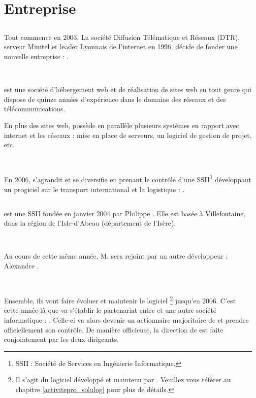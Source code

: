 \chapter{Entreprise}
\section{\fidit}
Tout commence en 2003. La société Diffusion Télématique et Réseaux (DTR), serveur Minitel et leader Lyonnais de l'internet en 1996, décide de fonder une nouvelle entreprise : \fidit{}.

~

\fidit{} est une société d'hébergement web et de réalisation de sites web en tout genre qui dispose de quinze années d'expérience dans le domaine des réseaux et des télécommunications.

En plus des sites web, \fidit{} possède en parallèle plusieurs systèmes en rapport avec internet et les réseaux : mise en place de serveurs, un logiciel de gestion de projet, etc.

~

En 2006, \fidit{} s'agrandit et se diversifie en prenant le contrôle d'une SSII\footnote{SSII : Société de Services en Ingénierie Informatique.} développant un progiciel sur le transport international et la logistique : \solulog.

\section{\solulog}
\solulog{} est une SSII fondée en janvier 2004 par Philippe . Elle est basée à Villefontaine, dans la région de l'Isle-d'Abeau (département de l'Isère).

~

Au cours de cette même année, M.  sera rejoint par un autre développeur : Alexandre .

~

Ensemble, ils vont faire évoluer et maintenir le logiciel \integrale{}\footnote{Il s'agit du logiciel développé et maintenu par \solulog. Veuillez vous référer au chapitre \ref{activitepro_solulog} pour plus de détails.} jusqu'en 2006. C'est cette année-là que va s'établir le partenariat entre \solulog{} et une autre société informatique : \fidit. Celle-ci va alors devenir un actionnaire majoritaire de \solulog{} et prendre officiellement son contrôle. De manière officieuse, la direction de \solulog{} est faite conjointement par les deux dirigeants.

